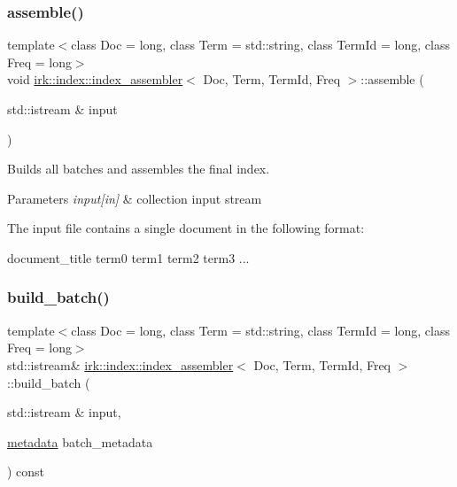 \subsubsection{\texorpdfstring{assemble()}{assemble()}}
{\footnotesize\ttfamily template$<$class Doc  = long, class Term  = std\+::string, class Term\+Id  = long, class Freq  = long$>$ \\
void \mbox{\hyperlink{classirk_1_1index_1_1index__assembler}{irk\+::index\+::index\+\_\+assembler}}$<$ Doc, Term, Term\+Id, Freq $>$\+::assemble (\begin{DoxyParamCaption}\item[{std\+::istream \&}]{input }\end{DoxyParamCaption})\hspace{0.3cm}{\ttfamily [inline]}}



Builds all batches and assembles the final index. 


\begin{DoxyParams}{Parameters}
{\em input\mbox{[}in\mbox{]}} & collection input stream\\
\hline
\end{DoxyParams}
The input file contains a single document in the following format\+: 
\begin{DoxyCode}
document\_title   term0 term1 term2 term3 ...
\end{DoxyCode}
 \mbox{\label{classirk_1_1index_1_1index__assembler_a42b294d02349c03a72aaf19a7882f230}} 
\subsubsection{\texorpdfstring{build\+\_\+batch()}{build\_batch()}}
{\footnotesize\ttfamily template$<$class Doc  = long, class Term  = std\+::string, class Term\+Id  = long, class Freq  = long$>$ \\
std\+::istream\& \mbox{\hyperlink{classirk_1_1index_1_1index__assembler}{irk\+::index\+::index\+\_\+assembler}}$<$ Doc, Term, Term\+Id, Freq $>$\+::build\+\_\+batch (\begin{DoxyParamCaption}\item[{std\+::istream \&}]{input,  }\item[{\mbox{\hyperlink{structirk_1_1index_1_1metadata}{metadata}}}]{batch\+\_\+metadata }\end{DoxyParamCaption}) const\hspace{0.3cm}{\ttfamily [inline]}}

